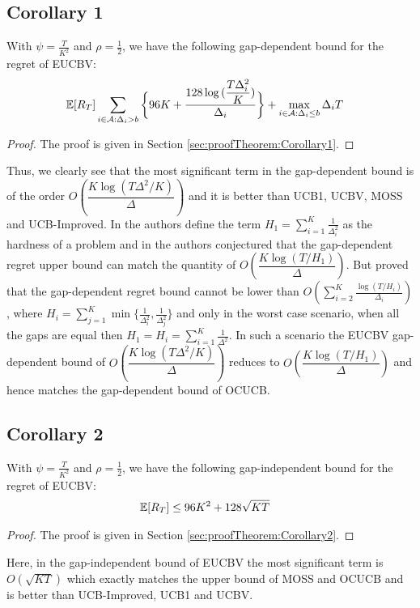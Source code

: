 \subsection{Corollary 1}
\begin{corollary}
\label{Result:Corollary:1}
With $\psi=\frac{T}{K^2}$ and $\rho=\frac{1}{2}$, we have the following gap-dependent bound for the regret of EUCBV:
\begin{align*}
\mathbb{E} [R_T] & \sum_{i\in \mathcal{A}:\Delta_{i} > b}\bigg\lbrace 96 K + \dfrac{128\log{(\dfrac{T\Delta_{i}^{2}}{ K})}}{\Delta_{i}}\bigg\rbrace 
 + \max\limits_{i\in \mathcal{A}:\Delta_{i}\leq b}\Delta_{i}T 
	\end{align*} 
\end{corollary}
\begin{proof}
The proof is given in Section \ref{sec:proofTheorem:Corollary1}.
\end{proof}
Thus, we clearly see that the most significant term in the gap-dependent bound is of the order $O\left(\dfrac{K\log{(T\Delta^{2}/K)}}{\Delta}\right)$ and it is better than UCB1, UCBV, MOSS and UCB-Improved. In \citet{audibert2010best} the authors define the term $H_1=\sum_{i=1}^{K}\frac{1}{\Delta_i^2}$ as the hardness of a problem and in \citet{bubeck2012regret} the authors conjectured that the gap-dependent regret upper bound can match the quantity of $O\left(\dfrac{K\log{(T/H_1)}}{\Delta}\right)$. But \citet{lattimore2015optimally} proved that the gap-dependent regret bound cannot be lower than $O\left(\sum_{i=2}^{K}\frac{\log\left(T/H_i\right)}{\Delta_i}\right)$, where $H_i=\sum_{j=1}^{K}\min\lbrace \frac{1}{\Delta_i^2},\frac{1}{\Delta_j^2}\rbrace$ and only in the worst case scenario, when all the gaps are equal then $H_1=H_{i}=\sum_{i=1}^{K}\frac{1}{\Delta^2}$. In such a scenario the EUCBV gap-dependent bound of $O\left(\dfrac{K\log{(T\Delta^{2}/ K)}}{\Delta}\right)$ reduces to $O\left(\dfrac{K\log{(T/H_1)}}{\Delta}\right)$ and hence matches the gap-dependent bound of OCUCB.

\subsection{Corollary 2}

\begin{corollary}
\label{Result:Corollary:2}
With $\psi=\frac{T}{K^2}$ and $\rho=\frac{1}{2}$, we have the following gap-independent bound for the regret of EUCBV:
\begin{align*}
\mathbb{E}[R_{T}] & \leq 96 K^2 + 128\sqrt{KT}
	\end{align*} 
\end{corollary}
\begin{proof}
The proof is given in Section \ref{sec:proofTheorem:Corollary2}.
\end{proof}
Here, in the gap-independent bound of EUCBV the most significant term is $O\left(\sqrt{KT}\right)$ which exactly matches the upper bound of MOSS and OCUCB and is better than UCB-Improved, UCB1 and UCBV.
